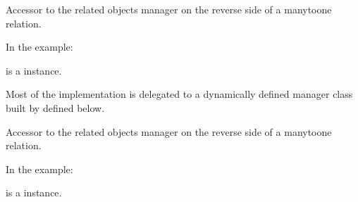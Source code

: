\documentclass[letterpaper,10pt,english]{sphinxmanual}
\begin{document}
\begin{fulllineitems}
\begin{fulllineitems}
\label{\detokenize{accounts:accounts.models.User.rbacgroup_set}}
Accessor to the related objects manager on the reverse side of a
many\sphinxhyphen{}to\sphinxhyphen{}one relation.

In the example:

\begin{sphinxVerbatim}[commandchars=\\\{\}]
 
       
\end{sphinxVerbatim}

 is a  instance.

Most of the implementation is delegated to a dynamically defined manager
class built by  defined below.

\end{fulllineitems}


\begin{fulllineitems}
\label{\detokenize{accounts:accounts.models.User.rbacusergroup_set}}
Accessor to the related objects manager on the reverse side of a
many\sphinxhyphen{}to\sphinxhyphen{}one relation.

In the example:

\begin{sphinxVerbatim}[commandchars=\\\{\}]
 
       
\end{sphinxVerbatim}

 is a  instance.


\end{fulllineitems}
\end{fulllineitems}
\end{document}
